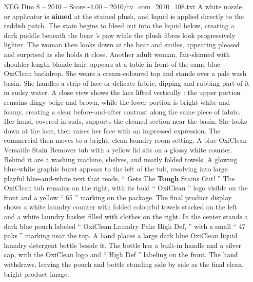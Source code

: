 \begin{textsample}{NEG Dim 8 – 2010 – Score -4.00 – 2010/tv\_com\_2010\_108.txt}
A white nozzle or applicator is \textbf{aimed} at the stained plush, and liquid is applied directly to the reddish patch.
The stain begins to bleed out into the liquid below, creating a dark puddle beneath the bear ’s paw while the plush fibres look progressively lighter.
The woman then looks down at the bear and smiles, appearing pleased and surprised as she holds it close.
Another adult woman, fair-skinned with shoulder-length blonde hair, appears at a table in front of the same blue OxiClean backdrop.
She wears a cream-coloured top and stands over a pale wash basin.
She handles a strip of lace or delicate fabric, dipping and rubbing part of it in sudsy water.
A close view shows the lace lifted vertically : the upper portion remains dingy beige and brown, while the lower portion is bright white and foamy, creating a clear before-and-after contrast along the same piece of fabric.
Her hand, covered in suds, supports the cleaned section near the basin.
She looks down at the lace, then raises her face with an impressed expression.
The commercial then moves to a bright, clean laundry-room setting.
A blue OxiClean Versatile Stain Remover tub with a yellow lid sits on a glossy white counter.
Behind it are a washing machine, shelves, and neatly folded towels.
A glowing blue-white graphic burst appears to the left of the tub, resolving into large playful blue-and-white text that reads, “ Gets The \textbf{Tough} Stains Out! ” The OxiClean tub remains on the right, with its bold “ OxiClean ” logo visible on the front and a yellow “ 65 ” marking on the package.
The final product display shows a white laundry counter with folded colourful towels stacked on the left and a white laundry basket filled with clothes on the right.
In the center stands a dark blue pouch labeled “ OxiClean Laundry Paks High Def, ” with a small “ 47 paks ” marking near the top.
A hand places a large dark blue OxiClean liquid laundry detergent bottle beside it.
The bottle has a built-in handle and a silver cap, with the OxiClean logo and “ High Def ” labeling on the front.
The hand withdraws, leaving the pouch and bottle standing side by side as the final clean, bright product image.

\end{textsample}
